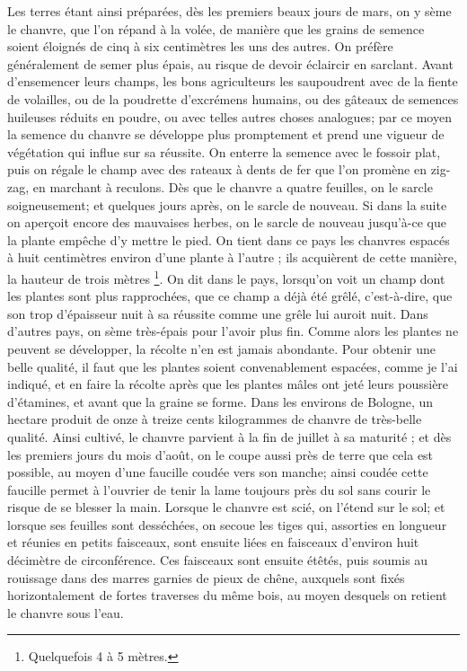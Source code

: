 Les terres étant ainsi préparées, dès les premiers beaux jours de mars, on y sème le chanvre, que l'on répand à la volée, de manière que les grains de semence soient éloignés de cinq à six centimètres les uns des autres. On préfère généralement de semer plus épais, au risque de devoir éclaircir en sarclant. Avant d'ensemencer leurs champs, les bons agriculteurs les saupoudrent avec de la fiente de volailles, ou de la poudrette d'excrémens humains, ou des gâteaux de semences huileuses réduits en poudre, ou avec telles autres choses analogues; par ce moyen la semence du chanvre se développe plus promptement et prend une vigueur de végétation qui influe sur sa réussite.
On enterre la semence avec le fossoir plat, puis on régale le champ avec des rateaux à dents de fer que l'on promène en zig-zag, en marchant à reculons. Dès que le chanvre a quatre feuilles, on le sarcle soigneusement; et quelques jours après, on le sarcle de nouveau. Si dans la suite on aperçoit encore des mauvaises herbes, on le sarcle de\setcounter{page}{171} nouveau jusqu'à-ce que la plante empêche d'y mettre le pied. On tient dans ce pays les chanvres espacés à huit centimètres environ d'une plante à l'autre ; ils acquièrent de cette manière, la hauteur de trois mètres \footnote{Quelquefois 4 à 5 mètres.}. On dit dans le pays, lorsqu'on voit un champ dont les plantes sont plus rapprochées, que ce champ a déjà été grêlé, c'est-à-dire, que son trop d'épaisseur nuit à sa réussite comme une grêle lui auroit nuit.
Dans d'autres pays, on sème très-épais pour l'avoir plus fin. Comme alors les plantes ne peuvent se développer, la récolte n'en est jamais abondante.
Pour obtenir une belle qualité, il faut que les plantes soient convenablement espacées, comme je l'ai indiqué, et en faire la récolte après que les plantes mâles ont jeté leurs poussière d'étamines, et avant que la graine se forme. Dans les environs de Bologne, un hectare produit de onze à treize cents kilogrammes de chanvre de très-belle qualité.
Ainsi cultivé, le chanvre parvient à la fin de juillet à sa maturité ; et dès les premiers jours du mois d'août, on le coupe aussi près\setcounter{page}{172} de terre que cela est possible, au moyen d'une faucille coudée vers son manche; ainsi coudée cette faucille permet à l'ouvrier de tenir la lame toujours près du sol sans courir le risque de se blesser la main. Lorsque le chanvre est scié, on l'étend sur le sol; et lorsque ses feuilles sont desséchées, on secoue les tiges qui, assorties en longueur et réunies en petits faisceaux, sont ensuite liées en faisceaux d'environ huit décimètre de circonférence. Ces faisceaux sont ensuite étêtés, puis soumis au rouissage dans des marres garnies de pieux de chêne, auxquels sont fixés horizontalement de fortes traverses du même bois, au moyen desquels on retient le chanvre sous l'eau.
